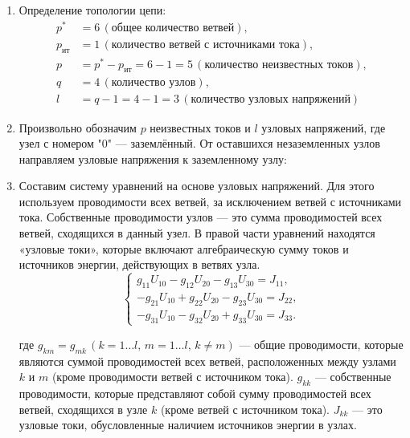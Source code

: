 \begin{enumerate}
	\item Определение топологии цепи:
	      \begin{align*}
		      p^*           & = 6 \, (\text{общее количество ветвей}),                                    \\
		      p_{\text{ит}} & = 1 \, (\text{количество ветвей с источниками тока}),                       \\
		      p             & = p^* - p_{\text{ит}} = 6 - 1 = 5 \, (\text{количество неизвестных токов}), \\
		      q             & = 4 \, (\text{количество узлов}),                                           \\
		      l             & = q - 1 = 4 - 1 = 3 \, (\text{количество узловых напряжений})
	      \end{align*}

	\item Произвольно обозначим $p$ неизвестных токов и $l$ узловых напряжений, где узел с номером "0" — заземлённый. От оставшихся незаземленных узлов направляем узловые напряжения к заземленному узлу:
	      

	\item Составим систему уравнений на основе узловых напряжений. Для этого используем проводимости всех ветвей, за исключением ветвей с источниками тока. Собственные проводимости узлов — это сумма проводимостей всех ветвей, сходящихся в данный узел. В правой части уравнений находятся «узловые токи», которые включают алгебраическую сумму токов и источников энергии, действующих в ветвях узла.
	      \[
		      \begin{cases}
			      g_{11} U_{10} - g_{12} U_{20} - g_{13} U_{30} = J_{11},  \\
			      -g_{21} U_{10} + g_{22} U_{20} - g_{23} U_{30} = J_{22}, \\
			      -g_{31} U_{10} - g_{32} U_{20} + g_{33} U_{30} = J_{33}.
		      \end{cases}
	      \]

	      где \( g_{km} = g_{mk} \, (k=1\ldots l, \, m=1\ldots l, \, k \neq m) \) — общие проводимости, которые являются суммой проводимостей всех ветвей, расположенных между узлами \( k \) и \( m \) (кроме проводимости ветвей с источником тока). \( g_{kk} \) — собственные проводимости, которые представляют собой сумму проводимостей всех ветвей, сходящихся в узле \( k \) (кроме ветвей с источником тока). \( J_{kk} \) — это узловые токи, обусловленные наличием источников энергии в узлах.


\end{enumerate}
